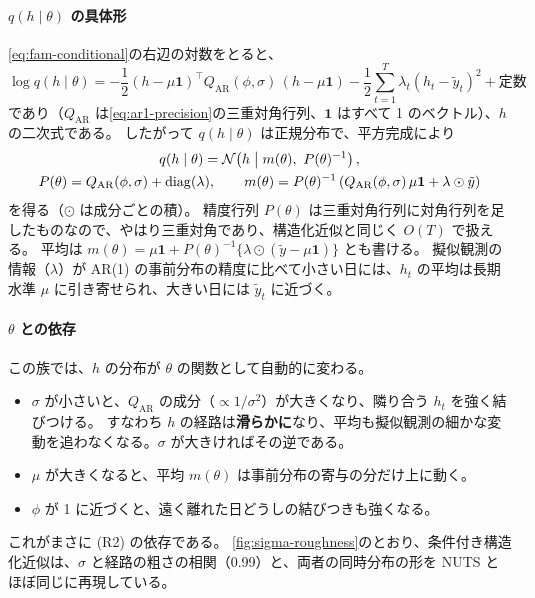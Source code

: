 \paragraph{$q(h \mid \theta)$ の具体形}
\cref{eq:fam-conditional}の右辺の対数をとると、
\[
  \log q(h \mid \theta) = -\frac{1}{2}(h - \mu\mathbf{1})^\top Q_{\mathrm{AR}}(\phi, \sigma)\,(h - \mu\mathbf{1}) - \frac{1}{2}\sum_{t=1}^{T} \lambda_t (h_t - \tilde y_t)^2 + \text{定数}
\]
であり（$Q_{\mathrm{AR}}$ は\cref{eq:ar1-precision}の三重対角行列、$\mathbf{1}$ はすべて 1 のベクトル）、$h$ の二次式である。
したがって $q(h \mid \theta)$ は正規分布で、平方完成により
\begin{equation}
  \begin{gathered}
  q(h \mid \theta) = \Normal\!\left(h \;\middle|\; m(\theta),\ P(\theta)^{-1}\right), \\
  P(\theta) = Q_{\mathrm{AR}}(\phi, \sigma) + \diag(\lambda), \qquad
  m(\theta) = P(\theta)^{-1}\left( Q_{\mathrm{AR}}(\phi, \sigma)\, \mu\mathbf{1} + \lambda \odot \tilde y \right)
  \end{gathered}
  \label{eq:fam-conditional-gauss}
\end{equation}
を得る（$\odot$ は成分ごとの積）。
精度行列 $P(\theta)$ は三重対角行列に対角行列を足したものなので、やはり三重対角であり、構造化近似と同じく $O(T)$ で扱える。
平均は $m(\theta) = \mu\mathbf{1} + P(\theta)^{-1}\{\lambda \odot (\tilde y - \mu\mathbf{1})\}$ とも書ける。
擬似観測の情報（$\lambda$）が AR(1) の事前分布の精度に比べて小さい日には、$h_t$ の平均は長期水準 $\mu$ に引き寄せられ、大きい日には $\tilde y_t$ に近づく。

\paragraph{$\theta$ との依存}
この族では、$h$ の分布が $\theta$ の関数として自動的に変わる。
\begin{itemize}
  \item $\sigma$ が小さいと、$Q_{\mathrm{AR}}$ の成分（$\propto 1/\sigma^2$）が大きくなり、隣り合う $h_t$ を強く結びつける。
    すなわち $h$ の経路は\textbf{滑らかに}なり、平均も擬似観測の細かな変動を追わなくなる。$\sigma$ が大きければその逆である。
  \item $\mu$ が大きくなると、平均 $m(\theta)$ は事前分布の寄与の分だけ上に動く。
  \item $\phi$ が 1 に近づくと、遠く離れた日どうしの結びつきも強くなる。
\end{itemize}
これがまさに (R2) の依存である。
\cref{fig:sigma-roughness}のとおり、条件付き構造化近似は、$\sigma$ と経路の粗さの相関（0.99）と、両者の同時分布の形を NUTS とほぼ同じに再現している。

